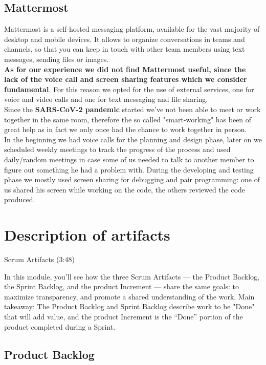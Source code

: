 \documentclass[a4paper,10pt]{report}
\begin{document}
\section[Mattermost] {Mattermost} %
Mattermost is a self-hosted messaging platform, available for the vast majority of desktop and mobile devices. It allows to organize conversations in teams and channels, so that you can keep in touch with other team members using text messages, sending files or images. \\
\textbf{As for our experience we did not find Mattermost useful, since the lack of the voice call and screen sharing features which we consider fundamental}. For this reason we opted for the use of external services, one for voice and video calls and one for text messaging and file sharing.\\
Since the \textbf{SARS-CoV-2 pandemic} started we've not been able to meet or work together in the same room, therefore the so called "smart-working" has been of great help as in fact we only once had the chance to work together in person. \\
In the beginning we had voice calls for the planning and design phase, later on we scheduled weekly meetings to track the progress of the process and used daily/random meetings in case some of us needed to talk to another member to figure out something he had a problem with.
During the developing and testing phase we mostly used screen sharing for debugging and pair programming: one of us shared his screen while working on the code, the others reviewed the code produced.
\chapter{Description of artifacts} %
Scrum Artifacts (3:48)

In this module, you’ll see how the three Scrum Artifacts — the Product Backlog, the Sprint Backlog, and the product Increment — share the same goals: to maximize transparency, and promote a shared understanding of the work. Main takeaway: The Product Backlog and Sprint Backlog describe work to be "Done" that will add value, and the product Increment is the “Done” portion of the product completed during a Sprint.
\section{Product Backlog} %
\end{document}
